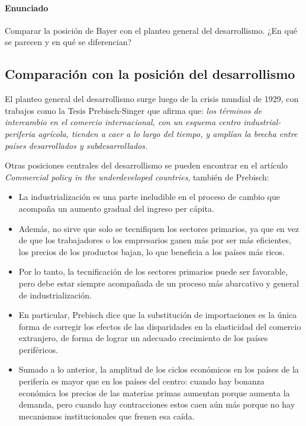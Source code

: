 \paragraph{Enunciado}
 Comparar la posición de Bayer con el planteo general del desarrollismo. ¿En qué se parecen y en qué se diferencian?

 \subsection{Comparación con la posición del desarrollismo}

 El planteo general del desarrollismo surge luego de la crisis mundial de 1929, con trabajos como la Tesis Prebisch-Singer que afirma que:
 \textit{los términos de intercambio en el comercio internacional, con un esquema centro industrial-periferia agrícola, tienden a caer a lo largo del tiempo,  y amplían la brecha entre países desarrollados y subdesarrollados.}


Otras posiciones centrales del desarrollismo se pueden encontrar en el artículo \textit{Commercial policy in the underdeveloped countries}, también de Prebisch:

 \begin{itemize}


    \item La industrialización es una parte ineludible en el proceso de cambio que acompaña un aumento gradual del ingreso per cápita.
    \item Además, no sirve que solo se tecnifiquen los sectores primarios, ya que en vez de que los trabajadores o los empresarios ganen más por ser más eficientes, los precios de los productos bajan, lo que beneficia a los países más ricos.
    \item Por lo tanto, la tecnificación de los sectores primarios puede ser favorable, pero debe estar siempre acompañada de un proceso más abarcativo y general de industrialización.
    \item En particular, Prebisch dice que la substitución de importaciones es la única forma de corregir los efectos de las disparidades en la elasticidad del comercio extranjero, de forma de lograr un adecuado crecimiento de los países periféricos.
    \item Sumado a lo anterior, la amplitud de los ciclos económicos en los países de la periferia es mayor que en los países del centro: cuando hay bonanza económica los precios de las materias primas aumentan porque aumenta la demanda, pero cuando hay contracciones estos caen aún más porque no hay mecanismos institucionales que frenen esa caída.
 \end{itemize}


